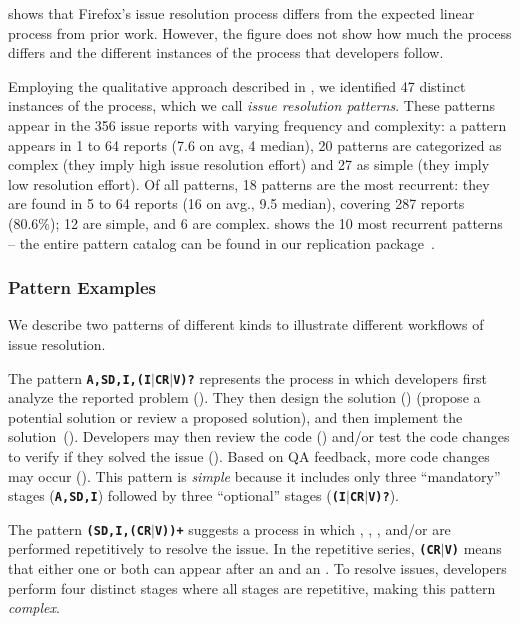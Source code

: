  shows that Firefox's issue resolution process differs from the expected linear process from prior work. However, the figure does not show how much the process differs and the different instances of the process that developers follow.

Employing the qualitative approach described in , we identified 47 distinct instances of the process, which we call \textit{issue resolution patterns}. These patterns appear in the 356 issue reports with varying frequency and complexity: a pattern appears in 1 to 64 reports (7.6 on avg, 4 median), 20 patterns are categorized as complex (they imply high issue resolution effort) and 27 as simple (they imply low resolution effort). Of all patterns, 18 patterns are the most recurrent: they are found in 5 to 64 reports (16 on avg., 9.5 median), covering 287 reports (80.6\%); 12 are simple, and 6 are complex.   shows the 10 most recurrent patterns -- the entire pattern catalog can be found in our replication package~\cite{repl_pack}. 

\subsubsection{\textbf{Pattern Examples}} We describe two patterns of different kinds to illustrate different workflows of issue resolution.

The pattern \texttt{\textbf{A,SD,I,(I$\mid$CR$\mid$V)?}} represents the process in which developers first analyze the reported problem (\ias). They then design the solution (\sds) (\eg propose a potential solution or review a proposed solution), and then implement the solution~(\impls). Developers may then review the code (\crvs) and/or test the code changes to verify if they solved the issue (\vers). Based on QA feedback, more code changes may occur (\impls). This pattern is  \textit{simple} because it includes only three ``mandatory'' stages (\texttt{\textbf{A,SD,I}}) followed by three ``optional'' stages (\texttt{\textbf{(I$\mid$CR$\mid$V)?}}).

The pattern {\texttt{\textbf{(SD,I,(CR$\mid$V))+}}} suggests a process in which \sd, \impl, \crv, and/or \ver are performed repetitively to resolve the issue. In the repetitive series, {\texttt{\textbf{(CR$\mid$V)}}} means that either one or both can appear after an \sds and an \impls. To resolve issues, developers perform four distinct stages where all stages are repetitive, making this pattern \textit{complex}.



